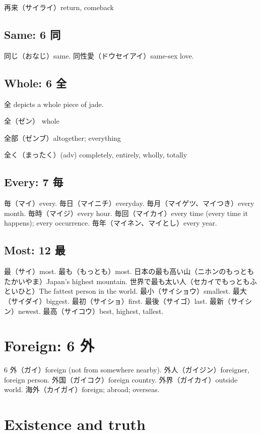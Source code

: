 再来（サイライ）return, comeback

\subsection{Same: 6 同}

同じ（おなじ）same.
同性愛（ドウセイアイ）same-sex love.

\subsection{Whole: 6 全}

全 depicts a whole piece of jade.

全（ゼン） whole

全部（ゼンブ）altogether; everything

全く（まったく）(adv) completely, entirely, wholly, totally

\subsection{Every: 7 毎}

毎（マイ）every.
毎日（マイニチ）everyday.
毎月（マイゲツ、マイつき）every month.
毎時（マイジ）every hour.
毎回（マイカイ）every time (every time it happens); every occurrence.
毎年（マイネン、マイとし）every year.

\subsection{Most: 12 最}

最（サイ）most.
最も（もっとも）most.
日本の最も高い山（ニホンのもっともたかいやま）Japan's highest mountain.
世界で最も太い人（セカイでもっともふといひと）The fattest person in the world.
最小（サイショウ）smallest.
最大（サイダイ）biggest.
最初（サイショ）first.
最後（サイゴ）last.
最新（サイシン）newest.
最高（サイコウ）best, highest, tallest.

\section{Foreign: 6 外}

6 外（ガイ）foreign (not from somewhere nearby).
外人（ガイジン）foreigner, foreign person.
外国（ガイコク）foreign country.
外界（ガイカイ）outside world.
海外（カイガイ）foreign; abroad; overseas.

\section{Existence and truth}

